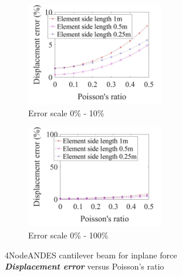 \documentclass[fleqn,11pt]{article}
\begin{document}


\begin{figure}[H]
  \begin{subfigure}{0.5\textwidth}
    \centering
    \includegraphics[width=6cm]{../Figure-files/error4andes_beam_dif_poisson_disp_inplane_div.jpeg}
    \caption{Error scale 0\% - 10\%}
  \end{subfigure}
  \begin{subfigure}{0.5\textwidth}
    \centering
    \includegraphics[width=6cm]{../Figure-files/error4andes_beam_dif_poisson_disp_inplane_div100.jpeg}
    \caption{Error scale 0\% - 100\%}
  \end{subfigure}
  \captionsetup{justification=centering,margin=2cm}
  \caption{4NodeANDES cantilever beam for inplane force\\
      \emph{\textbf{Displacement error}}   versus   Poisson's ratio}
  \label{table Displacement error 4NodeANDES cantilever beam for different Poisson ratio 2}
\end{figure}
\end{document}
